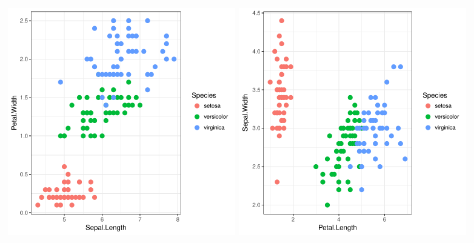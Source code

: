 \documentclass{article}\usepackage[]{graphicx}\usepackage[]{color}
\newenvironment{knitrout}{}{} %
\begin{document}
\begin{knitrout}
{\includegraphics[width=6cm,height=6cm]{figure/iris_data-5} 
\includegraphics[width=6cm,height=6cm]{figure/iris_data-6} 

}



\end{knitrout}
\end{document}
